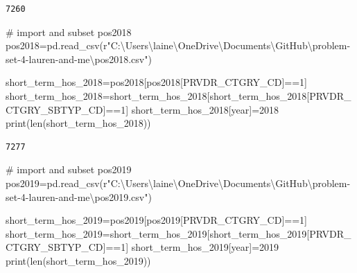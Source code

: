 \documentclass[
  letterpaper,
  DIV=11,
  numbers=noendperiod]{scrartcl}
\newenvironment{Shaded}{\begin{snugshade}}{\end{snugshade}}
\newcommand{\BuiltInTok}[1]{\textcolor[rgb]{0.00,0.23,0.31}{#1}}
\newcommand{\CommentTok}[1]{\textcolor[rgb]{0.37,0.37,0.37}{#1}}
\newcommand{\DecValTok}[1]{\textcolor[rgb]{0.68,0.00,0.00}{#1}}
\newcommand{\NormalTok}[1]{\textcolor[rgb]{0.00,0.23,0.31}{#1}}
\newcommand{\OperatorTok}[1]{\textcolor[rgb]{0.37,0.37,0.37}{#1}}
\newcommand{\StringTok}[1]{\textcolor[rgb]{0.13,0.47,0.30}{#1}}
\newcommand{\VerbatimStringTok}[1]{\textcolor[rgb]{0.13,0.47,0.30}{#1}}
\begin{document}
\begin{verbatim}
7260
\end{verbatim}

\begin{Shaded}
\begin{Highlighting}[]
\CommentTok{\# import and subset pos2018}
\NormalTok{pos2018}\OperatorTok{=}\NormalTok{pd.read\_csv(}\VerbatimStringTok{r"C:\textbackslash{}Users\textbackslash{}laine\textbackslash{}OneDrive\textbackslash{}Documents\textbackslash{}GitHub\textbackslash{}problem{-}set{-}4{-}lauren{-}and{-}me\textbackslash{}pos2018.csv"}\NormalTok{)}

\NormalTok{short\_term\_hos\_2018}\OperatorTok{=}\NormalTok{pos2018[pos2018[}\StringTok{\textquotesingle{}PRVDR\_CTGRY\_CD\textquotesingle{}}\NormalTok{]}\OperatorTok{==}\DecValTok{1}\NormalTok{]}
\NormalTok{short\_term\_hos\_2018}\OperatorTok{=}\NormalTok{short\_term\_hos\_2018[short\_term\_hos\_2018[}\StringTok{\textquotesingle{}PRVDR\_CTGRY\_SBTYP\_CD\textquotesingle{}}\NormalTok{]}\OperatorTok{==}\DecValTok{1}\NormalTok{]}
\NormalTok{short\_term\_hos\_2018[}\StringTok{\textquotesingle{}year\textquotesingle{}}\NormalTok{]}\OperatorTok{=}\DecValTok{2018}
\BuiltInTok{print}\NormalTok{(}\BuiltInTok{len}\NormalTok{(short\_term\_hos\_2018))}
\end{Highlighting}
\end{Shaded}

\begin{verbatim}
7277
\end{verbatim}

\begin{Shaded}
\begin{Highlighting}[]
\CommentTok{\# import and subset pos2019}
\NormalTok{pos2019}\OperatorTok{=}\NormalTok{pd.read\_csv(}\VerbatimStringTok{r"C:\textbackslash{}Users\textbackslash{}laine\textbackslash{}OneDrive\textbackslash{}Documents\textbackslash{}GitHub\textbackslash{}problem{-}set{-}4{-}lauren{-}and{-}me\textbackslash{}pos2019.csv"}\NormalTok{)}

\NormalTok{short\_term\_hos\_2019}\OperatorTok{=}\NormalTok{pos2019[pos2019[}\StringTok{\textquotesingle{}PRVDR\_CTGRY\_CD\textquotesingle{}}\NormalTok{]}\OperatorTok{==}\DecValTok{1}\NormalTok{]}
\NormalTok{short\_term\_hos\_2019}\OperatorTok{=}\NormalTok{short\_term\_hos\_2019[short\_term\_hos\_2019[}\StringTok{\textquotesingle{}PRVDR\_CTGRY\_SBTYP\_CD\textquotesingle{}}\NormalTok{]}\OperatorTok{==}\DecValTok{1}\NormalTok{]}
\NormalTok{short\_term\_hos\_2019[}\StringTok{\textquotesingle{}year\textquotesingle{}}\NormalTok{]}\OperatorTok{=}\DecValTok{2019}
\BuiltInTok{print}\NormalTok{(}\BuiltInTok{len}\NormalTok{(short\_term\_hos\_2019))}
\end{Highlighting}
\end{Shaded}
\end{document}
